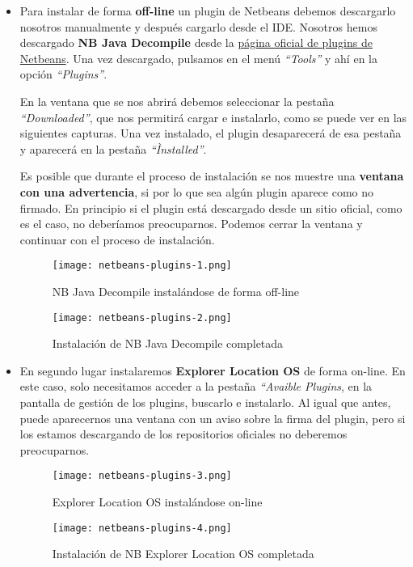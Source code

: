 \begin{itemize}
    \item Para instalar de forma \textbf{off-line} un plugin de Netbeans debemos descargarlo nosotros manualmente y después cargarlo desde el IDE. Nosotros hemos descargado \textbf{NB Java Decompile} desde la \href{https://plugins.netbeans.apache.org/catalogue/?id=80}{página oficial de plugins de Netbeans}. Una vez descargado, pulsamos en el menú \textit{``Tools''} y ahí en la opción \textit{``Plugins''}.

    En la ventana que se nos abrirá debemos seleccionar la pestaña \textit{``Downloaded''}, que nos permitirá cargar e instalarlo, como se puede ver en las siguientes capturas. Una vez instalado, el plugin desaparecerá de esa pestaña y aparecerá en la pestaña \textit{``Ìnstalled''}.

    Es posible que durante el proceso de instalación se nos muestre una \textbf{ventana con una advertencia}, si por lo que sea algún plugin aparece como no firmado. En principio si el plugin está descargado desde un sitio oficial, como es el caso, no deberíamos preocuparnos. Podemos cerrar la ventana y continuar con el proceso de instalación.

    \begin{figure}[H]
        \centering
        \texttt{[image: netbeans-plugins-1.png]}
        \caption{NB Java Decompile instalándose de forma off-line}
    \end{figure}

    \begin{figure}[H]
        \centering
        \texttt{[image: netbeans-plugins-2.png]}
        \caption{Instalación de NB Java Decompile completada}
    \end{figure}

    \item En segundo lugar instalaremos \textbf{Explorer Location OS} de forma on-line. En este caso, solo necesitamos acceder a la pestaña \textit{``Avaible Plugins}, en la pantalla de gestión de los plugins, buscarlo e instalarlo. Al igual que antes, puede aparecernos una ventana con un aviso sobre la firma del plugin, pero si los estamos descargando de los repositorios oficiales no deberemos preocuparnos.

     \begin{figure}[H]
        \centering
        \texttt{[image: netbeans-plugins-3.png]}
        \caption{Explorer Location OS instalándose on-line}
    \end{figure}

    \begin{figure}[H]
        \centering
        \texttt{[image: netbeans-plugins-4.png]}
        \caption{Instalación de NB Explorer Location OS completada}
    \end{figure}
\end{itemize}

